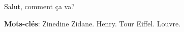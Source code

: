 Salut, comment ça va?
\vfill

\noindent \textbf {Mots-clés}: Zinedine Zidane. Henry. Tour Eiffel. Louvre.